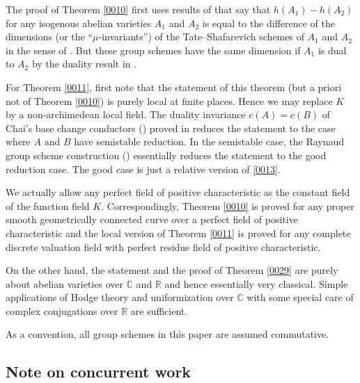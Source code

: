 \documentclass{amsart}
\theoremstyle{remark}
\numberwithin{equation}{section}
\newcommand{\R}{\mathbb{R}}
\newcommand{\C}{\mathbb{C}}
\begin{document}
The proof of Theorem \ref{0010} first uses results of \cite{GRS24}
that say that $h(A_{1}) - h(A_{2})$
for any isogenous abelian varieties $A_{1}$ and $A_{2}$ is equal to
the difference of the dimensions (or the ``$\mu$-invariants'') of
the Tate--Shafarevich schemes of $A_{1}$ and $A_{2}$
in the sense of \cite{Suz20a}.
But these group schemes have the same dimension
if $A_{1}$ is dual to $A_{2}$
by the duality result in \cite{Suz20a}.

For Theorem \ref{0011},
first note that the statement of this theorem
(but a priori not of Theorem \ref{0010}) is purely local at finite places.
Hence we may replace $K$ by a non-archimedean local field.
The duality invariance $c(A) = c(B)$
of Chai's base change conductors (\cite[Section 1]{Cha00})
proved in \cite{OS23} reduces the statement to the case
where $A$ and $B$ have semistable reduction.
In the semistable case,
the Raynaud group scheme construction
(\cite[Chapter III, Theorem C.15]{Mil06})
essentially reduces the statement to the good reduction case.
The good case is just a relative version of \eqref{0013}.

We actually allow any perfect field of positive characteristic
as the constant field of the function field $K$.
Correspondingly, Theorem \ref{0010} is proved for
any proper smooth geometrically connected curve
over a perfect field of positive characteristic
and the local version of
Theorem \ref{0011} is proved for
any complete discrete valuation field
with perfect residue field of positive characteristic.

On the other hand, the statement and the proof of Theorem \ref{0029}
are purely about abelian varieties over $\C$ and $\R$
and hence essentially very classical.
Simple applications of Hodge theory and uniformization over $\C$
with some special care of complex conjugations over $\R$ are sufficient.

As a convention,
all group schemes in this paper are assumed commutative.


\subsection{Note on concurrent work}
\end{document}
